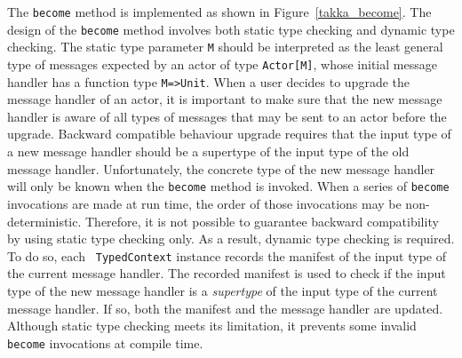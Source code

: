 The {\tt become} method is implemented as shown in Figure~\ref{takka_become}.  
The design of the {\tt become} method involves both static type checking 
and dynamic type checking.  The static type parameter {\tt M} should be 
interpreted as the least general type of messages expected by an actor 
of type {\tt Actor[M]}, whose initial message handler has a function type {\tt M=>Unit}.
When a user decides to upgrade the message handler of an actor, it is
important to make sure that the new message handler is aware of all
types of messages that may be sent to an actor before the
upgrade.  Backward compatible behaviour upgrade requires that the input type of a 
new message handler should be a supertype of the input type of the old message 
handler.  Unfortunately, the concrete type of the new message handler will only 
be known when the {\tt become} method is invoked. When a series of {\tt become} 
invocations are made at run time, the order of those invocations may be 
non-deterministic.  Therefore, it is not possible to guarantee backward 
compatibility by using static type checking only.
As a result, dynamic type checking is required.  To do so, each {\tt 
TypedContext} instance records the manifest of the input 
type of the current message handler.  The recorded manifest is used to check if 
the input type of the new message handler is a {\it supertype} of the 
input type of the current message handler.  If so, both the manifest and the 
message handler are updated.  Although static type checking meets its 
limitation, it prevents some invalid {\tt become} invocations at compile time.

